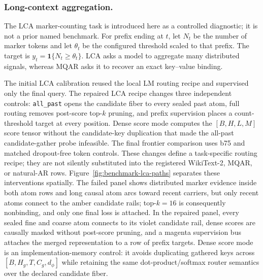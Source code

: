 \documentclass{article}
\theoremstyle{plain}
\theoremstyle{definition}
\theoremstyle{remark}
\begin{document}
\subsubsection{Long-context aggregation.}
\label{sec:benchmark-lca}
The LCA marker-counting task is introduced here as a controlled diagnostic; it
is not a prior named benchmark.  For prefix ending at $t$, let $N_t$ be the
number of marker tokens and let $\theta_t$ be the configured threshold scaled
to that prefix.  The target is $y_t=\mathbf 1\{N_t\ge\theta_t\}$.  LCA asks a
model to aggregate many distributed signals, whereas MQAR asks it to recover
an exact key--value binding.

The initial LCA calibration reused the local LM routing recipe and supervised
only the final query.  The repaired LCA recipe changes three independent
controls: \texttt{all\_past} opens the candidate fiber to every sealed past
atom, full routing removes post-score top-$k$ pruning, and prefix supervision
places a count-threshold target at every position.  Dense score mode computes
the $[B,H,L,M]$ score tensor without the candidate-key duplication that made
the all-past candidate-gather probe infeasible.  The final frontier comparison
uses b75 and matched dropout-free token controls.  These changes define a
task-specific routing recipe; they are not silently substituted into the
registered WikiText-2, MQAR, or natural-AR rows.
Figure~\ref{fig:benchmark-lca-paths} separates these interventions spatially.
The failed panel shows distributed marker evidence inside both atom rows and
long causal atom arcs toward recent carriers, but only recent atoms connect to
the amber candidate rails; top-$k=16$ is consequently nonbinding, and only one
final loss is attached.  In the repaired panel, every sealed fine and coarse
atom connects to its violet candidate rail, dense scores are causally masked
without post-score pruning, and a magenta supervision bus attaches the merged
representation to a row of prefix targets.
Dense score mode is an
implementation-memory control: it avoids duplicating gathered keys across
$[B,H_g,T,C_g,d_\phi]$ while retaining the same dot-product/softmax router
semantics over the declared candidate fiber.
\end{document}
